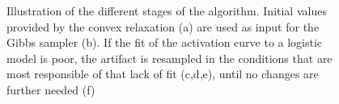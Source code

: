\documentclass[12pt,letterpaper,fleqn]{article}
\begin{document}
\begin{figure}[ht!]
\begin{subfigure}[b]{0.5\textwidth}
        \end{subfigure}
\caption{Illustration of the different stages of the algorithm. Initial values provided by the convex relaxation (a) are used as input for the Gibbs sampler (b). If the fit of the activation curve to a logistic model is poor, the artifact is resampled in the conditions that are most responsible of that lack of fit (c,d,e), until no changes are further needed (f)}
\end{figure}


  



    
\end{document}
